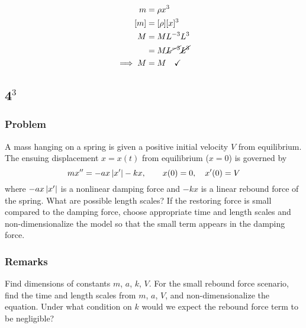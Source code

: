\documentclass[12pt]{article}
\begin{document}
\begin{equation}
  \begin{aligned}
    m &= \rho x^3 \\
    [m] &= [\rho] [x]^3 \\
    M &= ML^{-3} L^{3} \\
    &= M\cancel{L^{-3}} \cancel{L^{3}} \\
    \implies M &= M \quad\checkmark
  \end{aligned}
\end{equation}

\subsection{4$^3$}
\subsubsection*{Problem}
A mass hanging on a spring is given a positive initial velocity $V$ from
equilibrium. The ensuing displacement $x=x(t)$ from equilibrium ($x=0$) is
governed by
\begin{equation}
  \label{eq:4-problem}
  mx'' = -ax\left|{x'}\right|-kx, \qquad x(0) = 0,\quad x'(0) = V
\end{equation}
where
$-ax\left|{x'}\right|$ is a nonlinear damping force and $-kx$ is a linear rebound force
of the spring. What are possible length scales? If the restoring force is small
compared to the damping force, choose appropriate time and length scales and
non-dimensionalize the model so that the small term appears in the damping
force.

\subsubsection*{Remarks}
Find dimensions of constants $m$, $a$, $k$, $V$. For the small rebound force
scenario, find the time and length scales from $m$, $a$, $V$, and
non-dimensionalize the equation. Under what condition on $k$ would we expect the
rebound force term to be negligible?
\end{document}
